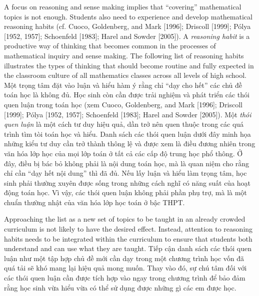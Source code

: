 \documentclass[
  10pt,
  a4paper,
  landscape,
  twoside,
  openany
]{scrbook}
\newcommand{\EN}[1]{#1}
\newcommand{\VI}[1]{#1}
\newcommand{\NOTE}[1]{#1}
\begin{document}
\TriPara
{
\EN{A focus on reasoning and sense making implies that ``covering'' mathematical topics is not enough. Students also need to experience and develop mathematical reasoning habits (cf. Cuoco, Goldenberg, and Mark [1996]; Driscoll [1999]; Pólya [1952, 1957]; Schoenfeld [1983]; Harel and Sowder [2005]). A \emph{reasoning habit} is a productive way of thinking that becomes common in the processes of mathematical inquiry and sense making. The following list of reasoning habits illustrates the types of thinking that should become routine and fully expected in the classroom culture of all mathematics classes across all levels of high school.}
}
{
\VI{Một trọng tâm đặt vào luận và hiểu hàm ý rằng chỉ ``dạy cho hết'' các chủ đề toán học là không đủ. Học sinh còn cần được trải nghiệm và phát triển các thói quen luận trong toán học (xem Cuoco, Goldenberg, and Mark [1996]; Driscoll [1999]; Pólya [1952, 1957]; Schoenfeld [1983]; Harel and Sowder [2005]). Một \emph{thói quen luận} là một cách tư duy hiệu quả, dần trở nên quen thuộc trong các quá trình tìm tòi toán học và hiểu. Danh sách các thói quen luận dưới đây minh họa những kiểu tư duy cần trở thành thông lệ và được xem là điều đương nhiên trong văn hóa lớp học của mọi lớp toán ở tất cả các cấp độ trung học phổ thông.}
}
{
\NOTE{Ở đây, điều bị bác bỏ không phải là nội dung toán học, mà là quan niệm cho rằng chỉ cần ``dạy hết nội dung'' thì đã đủ. Nếu lấy luận và hiểu làm trọng tâm, học sinh phải thường xuyên được sống trong những cách nghĩ có năng suất của hoạt động toán học. Vì vậy, các thói quen luận không phải phần phụ trợ, mà là một chuẩn thường nhật của văn hóa lớp học toán ở bậc THPT.}
}

\TriPara
{
\EN{Approaching the list as a new set of topics to be taught in an already crowded curriculum is not likely to have the desired effect. Instead, attention to reasoning habits needs to be integrated within the curriculum to ensure that students both understand and can use what they are taught.}
}
{
\VI{Tiếp cận danh sách các thói quen luận như một tập hợp chủ đề mới cần dạy trong một chương trình học vốn đã quá tải sẽ khó mang lại hiệu quả mong muốn. Thay vào đó, sự chú tâm đối với các thói quen luận cần được tích hợp vào ngay trong chương trình để bảo đảm rằng học sinh vừa hiểu vừa có thể sử dụng được những gì các em được học.}
}
{
\NOTE{}
}
\end{document}

